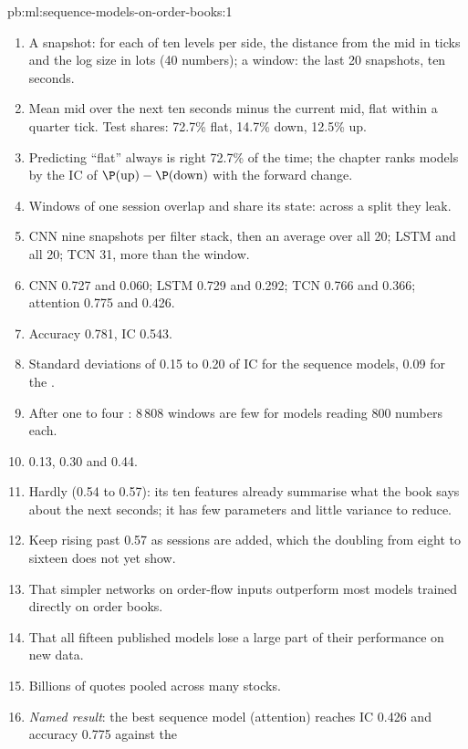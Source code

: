 \begin{solution}{pb:ml:sequence-models-on-order-books:1}
\begin{enumerate}
\item A snapshot: for each of ten levels per side, the distance from the mid in ticks and the log size in lots (40 numbers);
a window: the last 20 snapshots, ten seconds.
\item Mean mid over the next ten seconds minus the current mid, flat within a quarter tick. Test shares: 72.7\% flat,
14.7\% down, 12.5\% up.
\item Predicting ``flat'' always is right 72.7\% of the time; the chapter ranks models by the IC of $\P(\text{up}) -
\P(\text{down})$ with the forward change.
\item Windows of one session overlap and share its state: across a split they leak.
\item CNN nine snapshots per filter stack, then an average over all 20; LSTM and  all 20; TCN 31, more than the
window.
\item CNN 0.727 and 0.060; LSTM 0.729 and 0.292; TCN 0.766 and 0.366; attention 0.775 and 0.426.
\item Accuracy 0.781, IC 0.543.
\item Standard deviations of 0.15 to 0.20 of IC for the sequence models, 0.09 for the .
\item After one to four : 8\,808 windows are few for models reading 800 numbers each.
\item 0.13, 0.30 and 0.44.
\item Hardly (0.54 to 0.57): its ten features already summarise what the book says about the next seconds; it has few
parameters and little variance to reduce.
\item Keep rising past 0.57 as sessions are added, which the doubling from eight to sixteen does not yet show.
\item That simpler networks on order-flow inputs outperform most models trained directly on order books.
\item That all fifteen published models lose a large part of their performance on new data.
\item Billions of quotes pooled across many stocks.
\item \emph{Named result}: the best sequence model (attention) reaches IC 0.426 and accuracy 0.775 against the 
\end{enumerate}
\end{solution}
